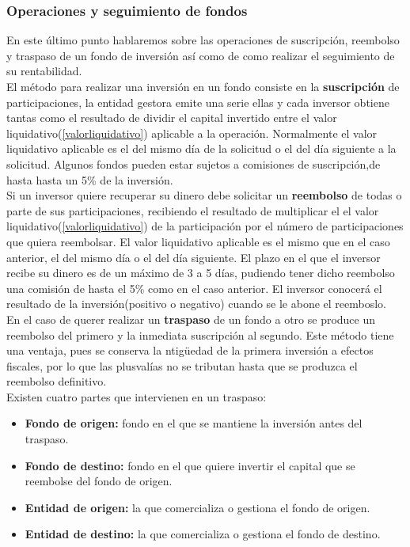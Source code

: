 \documentclass[12pt, a4paper]{article}
\begin{document}
\newpage

 \subsubsection{Operaciones y seguimiento de fondos}

En este último punto hablaremos sobre las operaciones de suscripción, reembolso y traspaso de un fondo de inversión así como de como realizar el seguimiento de su rentabilidad.\\

El método para realizar una inversión en un fondo consiste en la \textbf{suscripción} de participaciones, la entidad gestora emite una serie ellas y cada inversor obtiene tantas como el resultado de dividir el capital invertido entre el valor liquidativo(\ref{valorliquidativo}) aplicable a la operación. Normalmente el valor liquidativo aplicable es el del mismo día de la solicitud o el del día siguiente a la solicitud. Algunos fondos pueden estar sujetos a comisiones de suscripción,de hasta hasta un 5\% de la inversión.\\

Si un inversor quiere recuperar su dinero debe solicitar un \textbf{reembolso} de todas o parte de sus participaciones, recibiendo el resultado de multiplicar el el valor liquidativo(\ref{valorliquidativo}) de la participación por el número de participaciones que quiera reembolsar. El valor liquidativo aplicable es el mismo que en el caso anterior, el del mismo día o el del día siguiente. 
El plazo en el que el inversor recibe su dinero es de un máximo de 3 a 5 días, pudiendo tener dicho reembolso una comisión de hasta el 5\% como en el caso anterior. El inversor conocerá el resultado de la inversión(positivo o negativo) cuando se le abone el reemboslo.\\

En el caso de querer realizar un \textbf{traspaso} de un fondo a otro se produce un reembolso del primero y la inmediata suscripción al segundo. Este método tiene una ventaja, pues se conserva la ntigüedad de la primera inversión a efectos fiscales, por lo que las plusvalías no se tributan hasta que se produzca el reembolso definitivo.\\

Existen cuatro partes que intervienen en un traspaso:

\begin{itemize}
	\item \textbf{Fondo de origen:} fondo en el que se mantiene la inversión antes del traspaso.
	\item \textbf{Fondo de destino:} fondo en el que quiere invertir el capital que se reembolse del fondo de origen.
	\item \textbf{Entidad de origen:} la que comercializa o gestiona el fondo de origen.
	\item \textbf{Entidad de destino:} la que comercializa o gestiona el fondo de destino.
\end{itemize}
\end{document}
